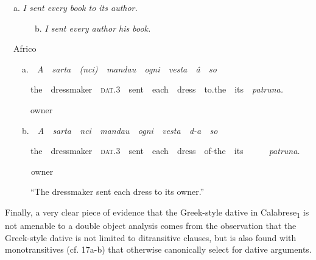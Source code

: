 \documentclass[output=paper,modfonts,nonflat]{langsci/langscibook}
\begin{document}
\begin{listWWNumviiileveli}
\item 
\begin{styleListParagraph}
\ \ a. \textit{I sent every book to its author.}\ \ 
\end{styleListParagraph}
\end{listWWNumviiileveli}
\begin{styleStandard}
\ \ \ \ \ \ \ b. \textit{I sent every author his book.}
\end{styleStandard}

\begin{listWWNumviiileveli}
\item 
\begin{styleListParagraph}
\ \ Africo
\end{styleListParagraph}
\end{listWWNumviiileveli}
\begin{styleListParagraph}
\ \ \ \ a.\ \ \textit{A\ \ sarta\ \ (nci)\ \ mandau\ \ ogni\ \ vesta\ \ â\ \ so }
\end{styleListParagraph}

\begin{styleListParagraph}
\ \ \ \ \ \ the\ \ dressmaker\ \ \textsc{dat}.3\ \ sent\ \ each\ \ dress\ \ to.the\ \ its\ \ \textit{patruna.}
\end{styleListParagraph}

\begin{styleStandard}
\ \ \ \ \ \ owner
\end{styleStandard}

\begin{styleStandard}
\ \ \ \ b.\ \ \textit{A\ \ sarta\ \ nci\ \ mandau\ \ ogni\ \ vesta\ \ d-a\ \ so\ \ }
\end{styleStandard}

\begin{styleStandard}
\ \ \ \ \ \ the\ \ dressmaker\ \ \textsc{dat}.3\ \ sent\ \ each\ \ dress\ \ of-the\ \ its\ \ \ \ \ \ \textit{patruna.}
\end{styleStandard}

\begin{styleStandard}
\textit{\ \ \ \ \ \ }owner
\end{styleStandard}

\begin{styleStandard}
\ \ \ \ \ \ “The dressmaker sent each dress to its owner.”
\end{styleStandard}

\begin{styleStandard}
Finally, a very clear piece of evidence that the Greek-style dative in Calabrese\textsubscript{1} is not amenable to a double object analysis comes from the observation that the Greek-style dative is not limited to ditransitive clauses, but is also found with monotransitives (cf. 17a-b) that otherwise canonically select for dative arguments.
\end{styleStandard}
\end{document}
